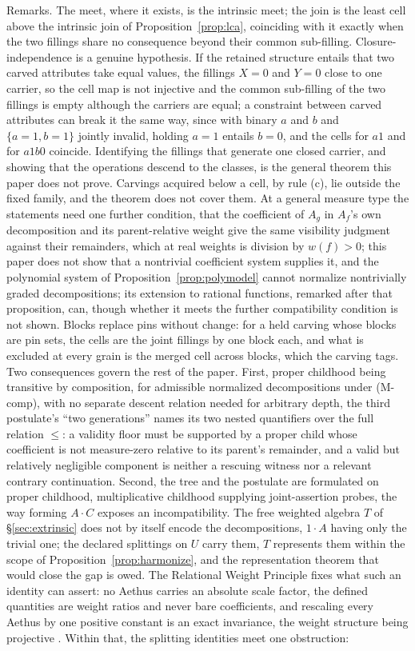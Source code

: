 \noindent Remarks. The meet, where it exists, is the intrinsic meet; the join is the least cell above the intrinsic join of Proposition~\ref{prop:lca}, coinciding with it exactly when the two fillings share no consequence beyond their common sub-filling. Closure-independence is a genuine hypothesis. If the retained structure entails that two carved attributes take equal values, the fillings $X = 0$ and $Y = 0$ close to one carrier, so the cell map is not injective and the common sub-filling of the two fillings is empty although the carriers are equal; a constraint between carved attributes can break it the same way, since with binary $a$ and $b$ and $\{a = 1, b = 1\}$ jointly invalid, holding $a = 1$ entails $b = 0$, and the cells for $a1$ and for $a1b0$ coincide. Identifying the fillings that generate one closed carrier, and showing that the operations descend to the classes, is the general theorem this paper does not prove. Carvings acquired below a cell, by rule (c), lie outside the fixed family, and the theorem does not cover them. At a general measure type the statements need one further condition, that the coefficient of $A_g$ in $A_f$'s own decomposition and its parent-relative weight give the same visibility judgment against their remainders, which at real weights is division by $w(f) > 0$; this paper does not show that a nontrivial coefficient system supplies it, and the polynomial system of Proposition~\ref{prop:polymodel} cannot normalize nontrivially graded decompositions; its extension to rational functions, remarked after that proposition, can, though whether it meets the further compatibility condition is not shown. Blocks replace pins without change: for a held carving whose blocks are pin sets, the cells are the joint fillings by one block each, and what is excluded at every grain is the merged cell across blocks, which the carving tags. Two consequences govern the rest of the paper. First, proper childhood being transitive by composition, for admissible normalized decompositions under (M-comp), with no separate descent relation needed for arbitrary depth, the third postulate's ``two generations'' names its two nested quantifiers over the full relation $\le$: a validity floor must be supported by a proper child whose coefficient is not measure-zero relative to its parent's remainder, and a valid but relatively negligible component is neither a rescuing witness nor a relevant contrary continuation. Second, the tree and the postulate are formulated on proper childhood, multiplicative childhood supplying joint-assertion probes, the way forming $A \cdot C$ exposes an incompatibility. The free weighted algebra $T$ of \S\ref{sec:extrinsic} does not by itself encode the decompositions, $1 \cdot A$ having only the trivial one; the declared splittings on $U$ carry them, $T$ represents them within the scope of Proposition~\ref{prop:harmonize}, and the representation theorem that would close the gap is owed. The Relational Weight Principle fixes what such an identity can assert: no Aethus carries an absolute scale factor, the defined quantities are weight ratios and never bare coefficients, and rescaling every Aethus by one positive constant is an exact invariance, the weight structure being projective \cite{Aethus}. Within that, the splitting identities meet one obstruction:
